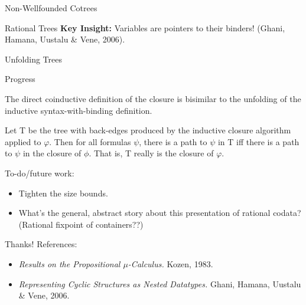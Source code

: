 \documentclass[aspectratio=169]{beamer}
\begin{document}
\begin{frame}{Non-Wellfounded Cotrees}
  \snippetcotree
\end{frame}

\begin{frame}{Rational Trees}
  \textbf{Key Insight:} Variables are pointers to their binders! (Ghani, Hamana, Uustalu \& Vene, 2006).

  \bigskip

  \snippetrational
\end{frame}

\begin{frame}{Unfolding Trees}
  \snippetunfolding
\end{frame}

\begin{frame}{Progress}

\begin{theorem}
  The direct coinductive definition of the closure is bisimilar to the unfolding of the inductive syntax-with-binding definition.
\end{theorem}

\bigskip

\begin{theorem}
Let T be the tree with back-edges produced by the inductive closure algorithm
applied to $\varphi$.
Then for all formulas $\psi$, there is a path to $\psi$ in T iff there is a path to $\psi$ in the closure of $\phi$. That is, T really is the closure of $\varphi$.
\end{theorem}

\bigskip

To-do/future work:
\begin{itemize}
        \item Tighten the size bounds.
        \smallskip
        \item What's the general, abstract story about this presentation of rational codata? (Rational fixpoint of containers??)
\end{itemize}

\end{frame}

\begin{frame}{Thanks!}
References:
\smallskip
\begin{itemize}
\item \emph{Results on the Propositional $\mu$-Calculus.} Kozen, 1983.
        \smallskip
\item \emph{Representing Cyclic Structures as Nested Datatypes.} Ghani, Hamana, Uustalu \& Vene, 2006.
\end{itemize}

\end{frame}
\end{document}
